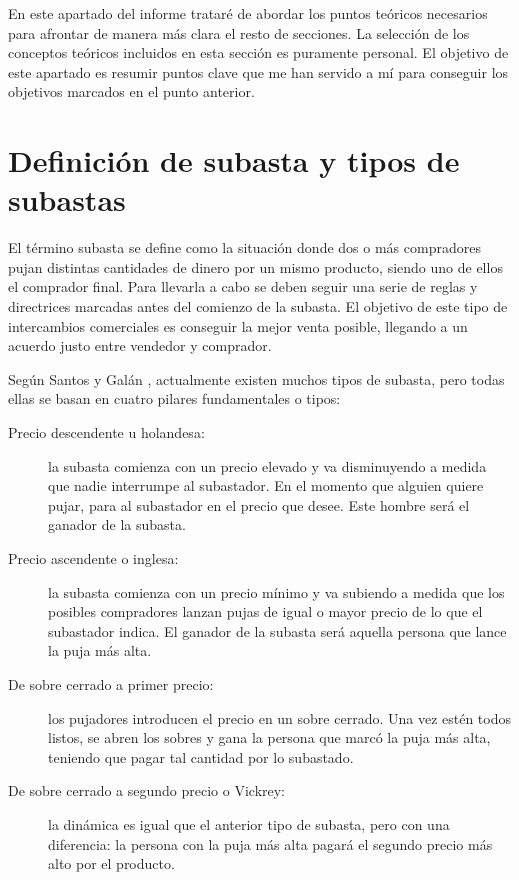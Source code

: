 	En este apartado del informe trataré de abordar los puntos teóricos necesarios para afrontar de manera más clara el resto de secciones. La selección de los conceptos teóricos incluidos en esta sección es puramente personal. El objetivo de este apartado es resumir puntos clave que me han servido a mí para conseguir los objetivos marcados en el punto anterior.
	
\section{Definición de subasta y tipos de subastas}

	El término subasta se define como la situación donde dos o más compradores pujan distintas cantidades de dinero por un mismo producto, siendo uno de ellos el comprador final. Para llevarla a cabo se deben seguir una serie de reglas y directrices marcadas antes del comienzo de la subasta. El objetivo de este tipo de intercambios comerciales es conseguir la mejor venta posible, llegando a un acuerdo justo entre vendedor y comprador.
	
	Según Santos y Galán \cite{apuntes:ecommerce_adwords}, actualmente existen muchos tipos de subasta, pero todas ellas se basan en cuatro pilares fundamentales o tipos:
	
	\begin{description}
		\item[Precio descendente u holandesa:] la subasta comienza con un precio elevado y va disminuyendo a medida que nadie interrumpe al subastador. En el momento que alguien quiere pujar, para al subastador en el precio que desee. Este hombre será el ganador de la subasta.
		\item[Precio ascendente o inglesa:] la subasta comienza con un precio mínimo y va subiendo a medida que los posibles compradores lanzan pujas de igual o mayor precio de lo que el subastador indica. El ganador de la subasta será aquella persona que lance la puja más alta.
		\item[De sobre cerrado a primer precio:] los pujadores introducen el precio en un sobre cerrado. Una vez estén todos listos, se abren los sobres y gana la persona que marcó la puja más alta, teniendo que pagar tal cantidad por lo subastado.
		\item[De sobre cerrado a segundo precio o Vickrey:] la dinámica es igual que el anterior tipo de subasta, pero con una diferencia: la persona con la puja más alta pagará el segundo precio más alto por el producto.
	\end{description}
	
